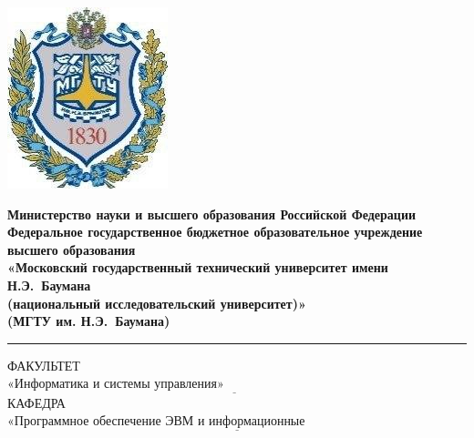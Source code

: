 
\begin{titlepage}
	\fontsize{12pt}{12pt}\selectfont
	\noindent \begin{minipage}{0.15\textwidth}
		\includegraphics[width=\linewidth]{assets/b_logo.jpg}
	\end{minipage}
	\noindent\begin{minipage}{0.9\textwidth}\centering
		\textbf{Министерство науки и высшего образования Российской Федерации}\\
		\textbf{Федеральное государственное бюджетное образовательное учреждение высшего образования}\\
		\textbf{«Московский государственный технический университет имени Н.Э.~Баумана}\\
		\textbf{(национальный исследовательский университет)»}\\
		\textbf{(МГТУ им. Н.Э.~Баумана)}
	\end{minipage}

	\noindent\rule{18cm}{3pt}
	\newline\newline
	\noindent ФАКУЛЬТЕТ $\underline{\text{«Информатика и системы управления»~~~~~~~~~~~~~~~~~~~~~~~~~~~~~~~~~~~~~~~~~~~~~~~~~~~~~~~~}}$ \newline\newline
	\noindent КАФЕДРА $\underline{\text{«Программное обеспечение ЭВМ и информационные технологии»~~~~~~~~~~~~~~~~~~~~~~~}}$\newline\newline\newline\newline\newline\newline\newline



\end{titlepage}
